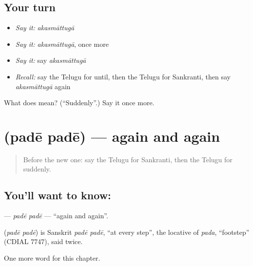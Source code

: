 \subsection*{Your turn}
\begin{itemize}
\raggedright
  \item \emph{Say it:} \emph{akasmāttugā}
  \item \emph{Say it:} \emph{akasmāttugā}, once more
  \item \emph{Say it:} say \emph{akasmāttugā}
  \item \emph{Recall:} say the Telugu for until, then the Telugu for Sankranti, then say \emph{akasmāttugā} again
\end{itemize}

\begin{tcolorbox}[breakable,colback=teal!4,colframe=teal!35!black,title={Before you move on}]
What does  mean? (\textquotedblleft{}Suddenly\textquotedblright{}.) Say it once more.
\end{tcolorbox}
\section[\texorpdfstring{\te{పదే} \te{పదే} (padē padē)}{పదే పదే (padē padē)}]{  (padē padē) — again and again}

\label{lesson:TE-C213-pade-pade}



\begin{quote}
Before the new one: say the Telugu for Sankranti, then the Telugu for suddenly.
\end{quote}

\subsection*{You'll want to know:  }
\textbf{ } — \emph{padē padē} — \textquotedblleft{}again and again\textquotedblright{}.

\begin{cousinweb}
\textbf{ } (\emph{padē padē}) is Sanskrit \emph{padē padē}, \textquotedblleft{}at every step\textquotedblright{}, the locative of \emph{pada}, \textquotedblleft{}footstep\textquotedblright{} (CDIAL 7747), said twice.
\end{cousinweb}

\begin{grammarlens}[title={What you've built}]
One more word for this chapter.
\end{grammarlens}

